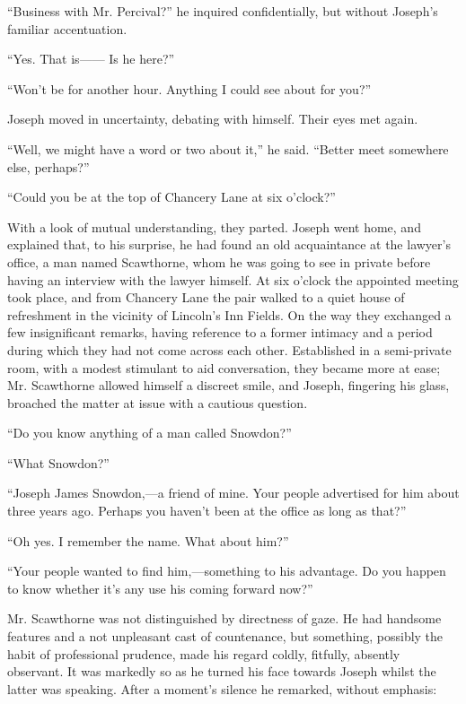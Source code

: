 ``Business with Mr. Percival?'' he inquired confidentially, but without
Joseph's familiar accentuation.

``Yes. That is{{------}} Is he here?''

``Won't be for another hour. Anything I could see about for you?''

Joseph moved in uncertainty, debating with himself. Their eyes met
again.

``Well, we might have a word or two about it,'' he said. ``Better meet
somewhere else, perhaps?''

``Could you be at the top of Chancery Lane at six o'clock?''

With a look of mutual understanding, they parted. Joseph went home, and
explained that, to his surprise, he had found an {}old acquaintance at
the lawyer's office, a man named Scawthorne, whom he was going to see in
private before having an interview with the lawyer himself. At six
o'clock the appointed meeting took place, and from Chancery Lane the
pair walked to a quiet house of refreshment in the vicinity of Lincoln's
Inn Fields. On the way they exchanged a few insignificant remarks,
having reference to a former intimacy and a period during which they had
not come across each other. Established in a semi-private room, with a
modest stimulant to aid conversation, they became more at ease; Mr.
Scawthorne allowed himself a discreet smile, and Joseph, fingering his
glass, broached the matter at issue with a cautious question.

``Do you know anything of a man called Snowdon?''

``What Snowdon?''

``Joseph James Snowdon,---a friend of mine. Your people advertised for
him about three years ago. Perhaps you haven't been at the office as
long as that?''

{}``Oh yes. I remember the name. What about him?''

``Your people wanted to find him,---something to his advantage. Do you
happen to know whether it's any use his coming forward now?''

Mr. Scawthorne was not distinguished by directness of gaze. He had
handsome features and a not unpleasant cast of countenance, but
something, possibly the habit of professional prudence, made his regard
coldly, fitfully, absently observant. It was markedly so as he turned
his face towards Joseph whilst the latter was speaking. After a moment's
silence he remarked, without emphasis:

